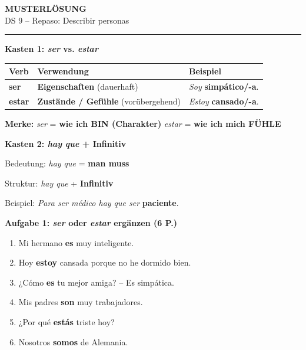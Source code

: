 \documentclass[11pt,a4paper]{article}
\newcommand{\lsg}[1]{\textcolor{loesung}{\textbf{#1}}}
\newcommand{\es}[1]{\textit{#1}}
\begin{document}
\begin{center}
{\Large\textbf{\textcolor{loesung}{MUSTERLÖSUNG}}}\\[0.3em]
{\large DS 9 -- Repaso: Describir personas}
\end{center}

\vspace{0.5em}
\hrule
\vspace{1em}

\begin{gruppenbox}

\textbf{Kasten 1: \es{ser} vs. \es{estar}}

\begin{tabularx}{\textwidth}{@{}|p{2.5cm}|X|X|@{}}
\hline
\textbf{Verb} & \textbf{Verwendung} & \textbf{Beispiel} \\
\hline
\textbf{ser} & \lsg{Eigenschaften} (dauerhaft) & \es{Soy} \lsg{simpático/-a}. \\
\hline
\textbf{estar} & \lsg{Zustände / Gefühle} (vorübergehend) & \es{Estoy} \lsg{cansado/-a}. \\
\hline
\end{tabularx}

\vspace{0.3em}
\textbf{Merke:} \es{ser} = \lsg{wie ich BIN (Charakter)} \hspace{0.5cm} \es{estar} = \lsg{wie ich mich FÜHLE}

\vspace{0.8em}

\textbf{Kasten 2: \es{hay que} + Infinitiv}

Bedeutung: \es{hay que} = \lsg{man muss}

Struktur: \es{hay que} + \lsg{Infinitiv}

Beispiel: \es{Para ser médico hay que ser} \lsg{paciente}.

\vspace{0.8em}

\textbf{Aufgabe 1: \es{ser} oder \es{estar} ergänzen (6 P.)}
\begin{enumerate}[label=\alph*), leftmargin=2em, nosep]
    \item Mi hermano \lsg{es} muy inteligente.
    \item Hoy \lsg{estoy} cansada porque no he dormido bien.
    \item ¿Cómo \lsg{es} tu mejor amiga? -- Es simpática.
    \item Mis padres \lsg{son} muy trabajadores.
    \item ¿Por qué \lsg{estás} triste hoy?
    \item Nosotros \lsg{somos} de Alemania.
\end{enumerate}


\end{gruppenbox}
\end{document}
